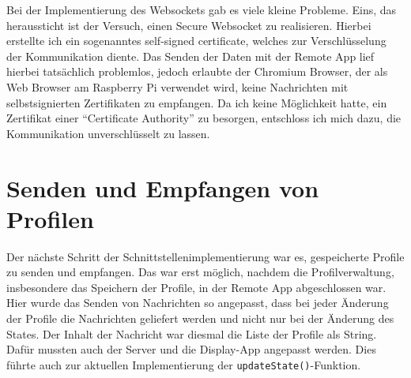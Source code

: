 Bei der Implementierung des Websockets gab es viele kleine Probleme. Eins, das heraussticht ist der Versuch, einen Secure Websocket zu realisieren. Hierbei erstellte ich ein sogenanntes self-signed certificate, welches zur Verschlüsselung der Kommunikation diente. Das Senden der Daten mit der Remote App lief hierbei tatsächlich problemlos, jedoch erlaubte der Chromium Browser, der als Web Browser am Raspberry Pi verwendet wird, keine Nachrichten mit selbstsignierten Zertifikaten zu empfangen. Da ich keine Möglichkeit hatte, ein Zertifikat einer \enquote{Certificate Authority} zu besorgen, entschloss ich mich dazu, die Kommunikation unverschlüsselt zu lassen.

\section{Senden und Empfangen von Profilen}
Der nächste Schritt der Schnittstellenimplementierung war es, gespeicherte Profile zu senden und empfangen. Das war erst möglich, nachdem die Profilverwaltung, insbesondere das Speichern der Profile, in der Remote App abgeschlossen war. Hier wurde das Senden von Nachrichten so angepasst, dass bei jeder Änderung der Profile die Nachrichten geliefert werden und nicht nur bei der Änderung des States. Der Inhalt der Nachricht war diesmal die Liste der Profile als String. Dafür mussten auch der Server und die Display-App angepasst werden. Dies führte auch zur aktuellen Implementierung der \texttt{updateState()}-Funktion.

